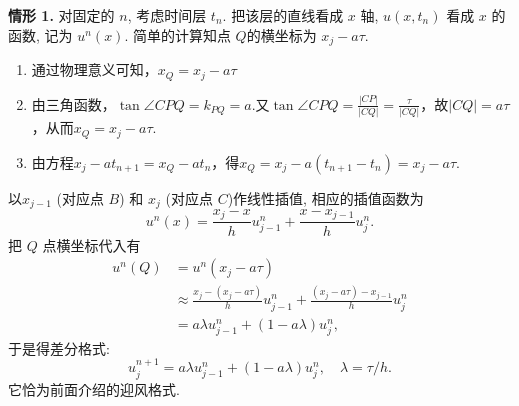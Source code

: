 \textbf{情形 1.} 对固定的 $n$, 考虑时间层 $t_n$. 把该层的直线看成 $x$ 轴, $u(x, t_n)$ 看成 $x$ 的函数, 记为 $u^n(x)$. 简单的计算知点 $Q$的横坐标为 $x_j - a\tau$. 
\begin{enumerate}[法 1]
    \item 通过物理意义可知，$x_Q=x_j-a\tau$
    \item 由三角函数，$\tan\angle CPQ=k_{PQ}=a$.又$\tan\angle CPQ=\frac{|CP|}{|CQ|}=\frac{\tau}{|CQ|}$，故$|CQ|=a\tau$，从而$x_Q=x_j-a\tau$.
    \item 由方程$x_j-at_{n+1}=x_Q-at_n$，得$x_Q=x_j-a(t_{n+1}-t_n)=x_j-a\tau$.
\end{enumerate}
\begin{center}
\end{center}
以$x_{j-1}$ (对应点 $B$) 和 $x_j$ (对应点 $C$)作线性插值, 相应的插值函数为
\begin{equation}
    u^n(x) = \frac{x_j - x}{h} u_{j-1}^n + \frac{x - x_{j-1}}{h} u_j^n.
\end{equation}
把 $Q$ 点横坐标代入有
\begin{equation*}
    \begin{aligned}
        u^n(Q) &= u^n(x_j - a\tau) \\
        &\approx \frac{x_j - (x_j - a\tau)}{h} u_{j-1}^n + \frac{(x_j - a\tau) - x_{j-1}}{h} u_j^n \\
        &= a\lambda u_{j-1}^n + (1-a\lambda)u_j^n,
    \end{aligned}
\end{equation*}
于是得差分格式:
\begin{equation}
    u_j^{n+1} = a\lambda u_{j-1}^n + (1-a\lambda)u_j^n, \quad \lambda = \tau/h.
\end{equation}
它恰为前面介绍的迎风格式.

